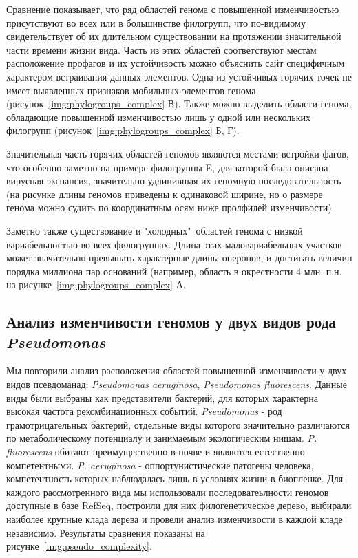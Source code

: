 Сравнение показывает, что ряд областей генома с повышенной изменчивостью присутствуют во всех или в большинстве филогрупп, что по-видимому свидетельствует об их длительном существовании на протяжении значительной части времени жизни вида. Часть из этих областей соответствуют местам расположение профагов и их устойчивость можно объяснить сайт специфичным характером встраивания данных элементов. Одна из устойчивых горячих точек не имеет выявленных признаков мобильных элементов генома (рисунок~\ref{img:phylogroups_complex} В). Также можно выделить области генома, обладающие повышенной изменчивостью лишь у одной или нескольких филогрупп (рисунок~\ref{img:phylogroups_complex} Б, Г).

Значительная часть горячих областей геномов являются местами встройки фагов, что особенно заметно на примере филогруппы E, для которой была описана вирусная экспансия, значительно удлинившая их геномную последовательность (на рисунке длины геномов приведены к одинаковой ширине, но о размере генома можно судить по координатным осям ниже пролфилей изменчивости).

Заметно также существование и "холодных"\ областей генома с низкой вариабельностью во всех филогруппах. Длина этих маловариабельных участков может значительно превышать характерные длины оперонов, и достигать величин порядка миллиона пар оснований (например, область в окрестности 4 млн. п.н. на рисунке~\ref{img:phylogroups_complex} А.

\subsection*{Анализ изменчивости геномов у двух видов рода \textit{Pseudomonas}}

Мы повторили анализ расположения областей повышенной изменчивости у двух видов псевдоманад: \textit{Pseudomonas aeruginosa}, \textit{Pseudomonas fluorescens}. Данные виды были выбраны как представители бактерий, для которых характерна высокая частота рекомбинационных событий. \textit{Pseudomonas} - род грамотрицательных бактерий, отдельные виды которого значительно различаются по метаболическому потенциалу и занимаемым экологическим нишам. \textit{P. fluorescens} обитают преимущественно в почве и являются естественно компетентными. \textit{P. aeruginosa} - оппортунистические патогены человека, компетентность которых наблюдалась лишь в условиях жизни в биопленке. Для каждого рассмотренного вида мы использовали последоватеьлности геномов доступные в базе RefSeq, построили для них филогенетическое дерево, выбирали наиболее крупные клада дерева и провели анализ изменчивости в каждой кладе независимо. Результаты сравнения показаны на рисунке~\ref{img:pseudo_complexity}. 

